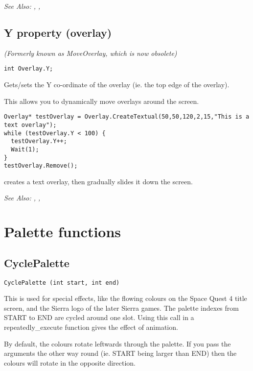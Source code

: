 \it{See Also:} ,
, 


\subsection{Y property (overlay)}\label{Overlay.Y}%

\it{(Formerly known as MoveOverlay, which is now obsolete)}

\begin{verbatim}
int Overlay.Y;
\end{verbatim}
Gets/sets the Y co-ordinate of the overlay (ie. the top edge of the overlay).

This allows you to dynamically move overlays around the screen.

\begin{verbatim}
Overlay* testOverlay = Overlay.CreateTextual(50,50,120,2,15,"This is a text overlay");
while (testOverlay.Y < 100) {
  testOverlay.Y++;
  Wait(1);
}
testOverlay.Remove();
\end{verbatim}
creates a text overlay, then gradually slides it down the screen.

\it{See Also:} ,
, 


\section{Palette functions}%

\subsection{CyclePalette}\label{CyclePalette}%

\begin{verbatim}
CyclePalette (int start, int end)
\end{verbatim}
This is used for special effects, like the flowing colours on the Space
Quest 4 title screen, and the Sierra logo of the later Sierra games.
The palette indexes from START to END are cycled around one slot. Using
this call in a repeatedly_execute function gives the effect of animation.

By default, the colours rotate leftwards through the palette. If you pass
the arguments the other way round (ie. START being larger than END) then
the colours will rotate in the opposite direction.

